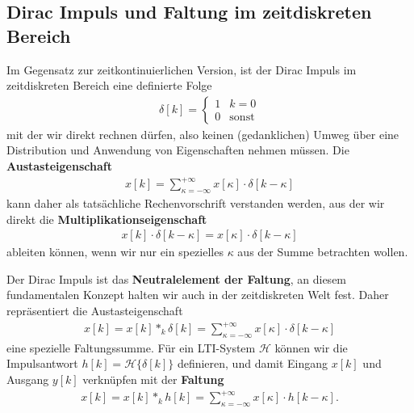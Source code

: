 \subsection*{Dirac Impuls und Faltung im zeitdiskreten Bereich}
Im Gegensatz zur zeitkontinuierlichen Version, ist der Dirac Impuls im zeitdiskreten
Bereich eine definierte Folge
\begin{align}
\delta[k] =
\begin{cases}
1 & k=0\\
0 & \text{sonst}
\end{cases}
\end{align}
mit der wir direkt rechnen dürfen, also keinen (gedanklichen) Umweg über
eine Distribution und Anwendung von Eigenschaften nehmen müssen.
%
Die \textbf{Austasteigenschaft}
\begin{align}
x[k] = \sum_{\kappa=-\infty}^{+\infty} x[\kappa]
\cdot \delta[k-\kappa]
\end{align}
kann daher als tatsächliche Rechenvorschrift verstanden werden, aus der wir
direkt die \textbf{Multiplikationseigenschaft}
\begin{align}
x[k] \cdot \delta[k-\kappa] = x[\kappa] \cdot \delta[k-\kappa]
\end{align}
ableiten können, wenn wir nur ein spezielles $\kappa$ aus der Summe betrachten
wollen.

Der Dirac Impuls ist das \textbf{Neutralelement der Faltung}, an diesem fundamentalen
Konzept halten wir auch in der zeitdiskreten Welt fest. Daher repräsentiert die
Austasteigenschaft
\begin{align}
x[k] = x[k] \ast_k \delta[k] = \sum_{\kappa=-\infty}^{+\infty} x[\kappa]
\cdot \delta[k-\kappa]
\end{align}
eine spezielle Faltungssumme. Für ein LTI-System $\mathcal{H}$ können wir
die Impulsantwort $h[k]=\mathcal{H}\{\delta[k]\}$ definieren, und damit
Eingang $x[k]$ und Ausgang $y[k]$ verknüpfen mit der \textbf{Faltung}
\begin{align}
x[k] = x[k] \ast_k h[k] = \sum_{\kappa=-\infty}^{+\infty} x[\kappa]
\cdot h[k-\kappa].
\end{align}
%

